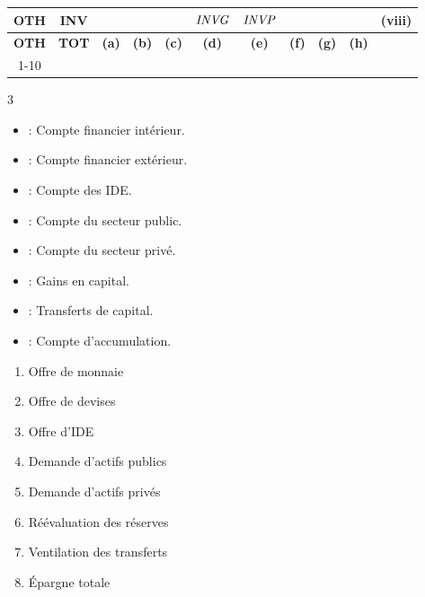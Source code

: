 \begin{table}[!h]
{\begin{tabular}{|c|c|c|c|c|c|c|c|c|c|c|}
			\sffamily \textbf{OTH} &\sffamily\textbf{INV}  &       &       &       & $\mathit{INVG}$ & $\mathit{INVP}$ &       &        && \sffamily \textbf{(viii)} \\
			\hline
			\sffamily \textbf{OTH} &\sffamily\textbf{TOT}  &   \sffamily \textbf{(a)}    &    \sffamily \textbf{(b)}   &  \sffamily \textbf{(c)}     & \sffamily \textbf{(d)} & \sffamily \textbf{(e)} &   \sffamily \textbf{(f)}    &    \sffamily \textbf{(g)}    &\sffamily \textbf{(h)}& \multicolumn{1}{r}{} \\
			\cline{1-10} 
	\end{tabular}}
	\begin{multicols}{3}
		\begin{itemize}[leftmargin=!,labelwidth=3.5em,itemsep=4pt,parsep=0pt,topsep=0pt]
			\item[\sffamily\textbf{DFIN}] : Compte financier intérieur.
			\item[\sffamily\textbf{FFIN}] : Compte financier extérieur.
			\item[\sffamily\textbf{FFDI}] : Compte des IDE.
			\item[\sffamily\textbf{GFIN}] : Compte du secteur public.
			\item[\sffamily\textbf{PFIN}] : Compte du secteur privé.
			\item[\sffamily\textbf{KGAIN}] : Gains en capital.
			\item[\sffamily\textbf{KTRA}] : Transferts de capital.
			\item[\sffamily\textbf{INV}] : Compte d'accumulation.
		\end{itemize}
		
		\columnbreak
		
		\begin{enumerate}[font=\bfseries\sffamily,label=(\alph*),itemsep=4pt,parsep=0pt,topsep=0pt,leftmargin=*] 
			\item Offre de monnaie
			\item Offre de devises
			\item Offre d'IDE
			\item Demande d'actifs publics
			\item Demande d'actifs privés
			\item Réévaluation des réserves
			\item Ventilation des transferts
			\item Épargne totale
		\end{enumerate}
		
		\columnbreak
		

\end{multicols}
\end{table}
